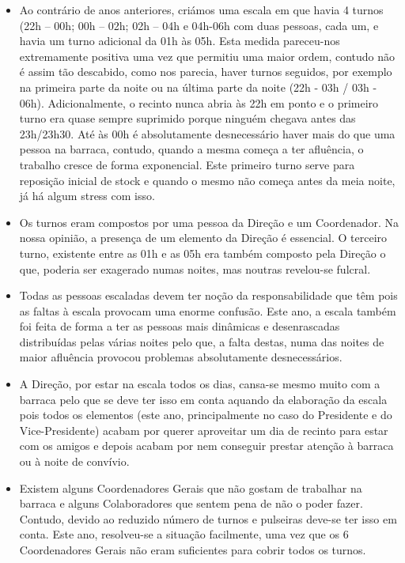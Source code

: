 \begin{itemize}
    \begin{itemize}
        \item Ao contrário de anos anteriores, criámos uma escala em que havia 4 turnos (22h – 00h; 00h – 02h; 02h – 04h e 04h-06h com duas pessoas, cada um, e havia um turno adicional da 01h às 05h. Esta medida pareceu-nos extremamente positiva uma vez que permitiu uma maior ordem, contudo não é assim tão descabido, como nos parecia, haver turnos seguidos, por exemplo na primeira parte da noite ou na última parte da noite (22h - 03h / 03h - 06h). Adicionalmente, o recinto nunca abria às 22h em ponto e o primeiro turno era quase sempre suprimido porque ninguém chegava antes das 23h/23h30. Até às 00h é absolutamente desnecessário haver mais do que uma pessoa na barraca, contudo, quando a mesma começa a ter afluência, o trabalho cresce de forma exponencial. Este primeiro turno serve para reposição inicial de stock e quando o mesmo não começa antes da meia noite, já há algum stress com isso.
        \item Os turnos eram compostos por uma pessoa da Direção e um Coordenador. Na nossa opinião, a presença de um elemento da Direção é essencial. O terceiro turno, existente entre as 01h e as 05h era também composto pela Direção o que, poderia ser exagerado numas noites, mas noutras revelou-se fulcral.
        \item Todas as pessoas escaladas devem ter noção da responsabilidade que têm pois as faltas à escala provocam uma enorme confusão. Este ano, a escala também foi feita de forma a ter as pessoas mais dinâmicas e desenrascadas distribuídas pelas várias noites pelo que, a falta destas, numa das noites de maior afluência provocou problemas absolutamente desnecessários.
        \item A Direção, por estar na escala todos os dias, cansa-se mesmo muito com a barraca pelo que se deve ter isso em conta aquando da elaboração da escala pois todos os elementos (este ano, principalmente no caso do Presidente e do Vice-Presidente) acabam por querer aproveitar um dia de recinto para estar com os amigos e depois acabam por nem conseguir prestar atenção à barraca ou à noite de convívio.
        \item Existem alguns Coordenadores Gerais que não gostam de trabalhar na barraca e alguns Colaboradores que sentem pena de não o poder fazer. Contudo, devido ao reduzido número de turnos e pulseiras deve-se ter isso em conta. Este ano, resolveu-se a situação facilmente, uma vez que os 6 Coordenadores Gerais não eram suficientes para cobrir todos os turnos.

\end{itemize}
\end{itemize}
